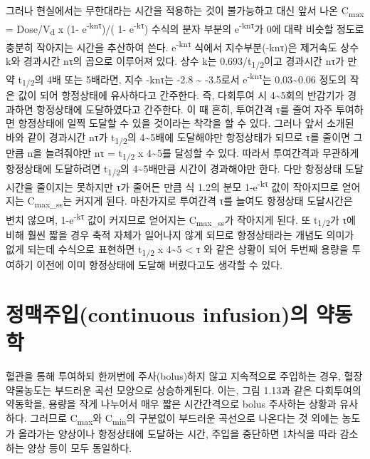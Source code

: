 \documentclass[
  11pt,
  krantz2, a4paper, twoside]{krantz}
\begin{document}
그러나 현실에서는 무한대라는 시간을 적용하는 것이 불가능하고 대신 앞서
나온 C\textsubscript{max} = Dose/V\textsubscript{d} x (1- e\textsuperscript{-knτ})/( 1- e\textsuperscript{-kτ}) 수식의 분자 부분의
e\textsuperscript{-knτ}가 0에 대략 비슷할 정도로 충분히 작아지는 시간을 추산하여 쓴다.
e\textsuperscript{-knτ} 식에서 지수부분(-knτ)은 제거속도 상수 k와 경과시간 nτ의 곱으로
이루어져 있다. 상수 k는 0.693/t\textsubscript{1/2}이고 경과시간 nτ가 만약 t\textsubscript{1/2}의 4배
또는 5배라면, 지수 -knτ는 -2.8 \textasciitilde{} -3.5로서 e\textsuperscript{-knτ}는 0.03\textasciitilde0.06 정도의
작은 값이 되어 항정상태에 유사하다고 간주한다. 즉, 다회투여 시 4\textasciitilde5회의
반감기가 경과하면 항정상태에 도달하였다고 간주한다. 이 때 흔히, 투여간격
τ를 줄여 자주 투여하면 항정상태에 일찍 도달할 수 있을 것이라는 착각을 할
수 있다. 그러나 앞서 소개된 바와 같이 경과시간 nτ가 t\textsubscript{1/2}의 4\textasciitilde5배에
도달해야만 항정상태가 되므로 τ를 줄이면 그만큼 n을 늘려줘야만 nτ =
t\textsubscript{1/2} x 4\textasciitilde5를 달성할 수 있다. 따라서 투여간격과 무관하게 항정상태에
도달하려면 t\textsubscript{1/2}의 4\textasciitilde5배만큼 시간이 경과해야만 한다. 다만 항정상태
도달시간을 줄이지는 못하지만 τ가 줄어든 만큼 식 1.2의 분모 1-e\textsuperscript{-kτ} 값이
작아지므로 얻어지는 C\textsubscript{max\_ss}는 커지게 된다. 마찬가지로 투여간격 τ를
늘여도 항정상태 도달시간은 변치 않으며, 1-e\textsuperscript{-kτ} 값이 커지므로 얻어지는
C\textsubscript{max\_ss}가 작아지게 된다. 또 t\textsubscript{1/2}가 τ에 비해 훨씬 짧을 경우 축적
자체가 일어나지 않게 되므로 항정상태라는 개념도 의미가 없게 되는데
수식으로 표현하면 t\textsubscript{1/2} x 4\textasciitilde5 \textless{} τ 와 같은 상황이 되어 두번째 용량을
투여하기 이전에 이미 항정상태에 도달해 버렸다고도 생각할 수 있다.

\hypertarget{uxc815uxb9e5uxc8fcuxc785continuous-infusionuxc758-uxc57duxb3d9uxd559}{%
\section{정맥주입(continuous infusion)의 약동학}\label{uxc815uxb9e5uxc8fcuxc785continuous-infusionuxc758-uxc57duxb3d9uxd559}}

혈관을 통해 투여하되 한꺼번에 주사(bolus)하지 않고 지속적으로 주입하는
경우, 혈장약물농도는 부드러운 곡선 모양으로 상승하게된다. 이는, 그림
1.13과 같은 다회투여의 약동학을, 용량을 작게 나누어서 매우 짧은
시간간격으로 bolus 주사하는 상황과 유사하다. 그러므로 C\textsubscript{max}와 C\textsubscript{min}의
구분없이 부드러운 곡선으로 나온다는 것 외에는 농도가 올라가는 양상이나
항정상태에 도달하는 시간, 주입을 중단하면 1차식을 따라 감소하는 양상
등이 모두 동일하다.
\end{document}
